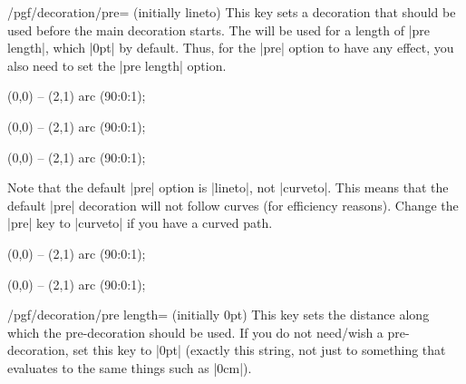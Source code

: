 \begin{key}{/pgf/decoration/pre= (initially lineto)}
    This key sets a decoration that should be used before the main decoration
    starts. The  will be used for a length of |pre length|,
    which |0pt| by default. Thus, for the |pre| option to have any effect, you
    also need to set the |pre length| option.
\begin{codeexample}[preamble={\usetikzlibrary{decorations.pathmorphing}}]
\tikz [decoration={zigzag,pre=lineto,pre length=1cm}]
  \draw [decorate] (0,0) -- (2,1) arc (90:0:1);
\end{codeexample}
\begin{codeexample}[preamble={\usetikzlibrary{decorations.pathmorphing}}]
\tikz [decoration={zigzag,pre=moveto,pre length=1cm}]
  \draw [decorate] (0,0) -- (2,1) arc (90:0:1);
\end{codeexample}
\begin{codeexample}[preamble={\usetikzlibrary{
    decorations.pathmorphing,
    decorations.shapes,
}}]
\tikz [decoration={zigzag,pre=crosses,pre length=1cm}]
  \draw [decorate] (0,0) -- (2,1) arc (90:0:1);
\end{codeexample}

    Note that the default |pre| option is |lineto|, not |curveto|. This means
    that the default |pre| decoration will not follow curves (for efficiency
    reasons). Change the |pre| key to |curveto| if you have a curved path.
\begin{codeexample}[preamble={\usetikzlibrary{decorations.pathmorphing}}]
\tikz [decoration={zigzag,pre length=3cm}]
  \draw [decorate] (0,0) -- (2,1) arc (90:0:1);
\end{codeexample}
\begin{codeexample}[preamble={\usetikzlibrary{decorations.pathmorphing}}]
\tikz [decoration={zigzag,pre=curveto,pre length=3cm}]
  \draw [decorate] (0,0) -- (2,1) arc (90:0:1);
\end{codeexample}
\end{key}

\begin{key}{/pgf/decoration/pre length= (initially 0pt)}
    This key sets the distance along which the pre-decoration should be used.
    If you do not need/wish a pre-decoration, set this key to |0pt| (exactly
    this string, not just to something that evaluates to the same things such
    as |0cm|).
\end{key}

